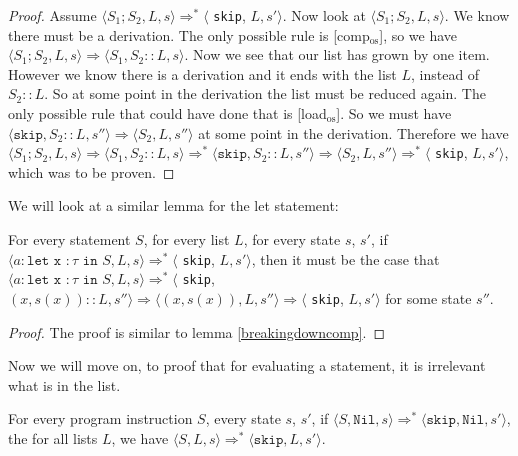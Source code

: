 \begin{proof}
Assume $\langle S_1; S_2, L, s \rangle \Rightarrow ^{*} \langle$ \texttt{skip}, $L, s' \rangle$. Now look at $\langle S_1; S_2, L, s \rangle$. We know there must be a derivation. The only possible rule is [comp$_{\textrm{os}}$], so we have $\langle S_1; S_2, L, s \rangle \Rightarrow \langle S_1, S_2::L, s \rangle$. Now we see that our list has grown by one item. However we know there is a derivation and it ends with the list $L$, instead of $S_2::L$. So at some point in the derivation the list must be reduced again. The only possible rule that could have done that is [load$_{\textrm{os}}$]. So we must have $\langle \texttt{skip} , S_2::L, s'' \rangle \Rightarrow \langle S_2, L, s'' \rangle$ at some point in the derivation. Therefore we have $\langle S_1; S_2, L, s \rangle \Rightarrow \langle S_1, S_2::L, s \rangle \Rightarrow ^{*} \langle \texttt{skip} , S_2::L, s'' \rangle \Rightarrow \langle S_2, L, s'' \rangle \Rightarrow ^{*} \langle$ \texttt{skip}, $L, s' \rangle$, which was to be proven.
\end{proof}

We will look at a similar lemma for the let statement:

\begin{lemma}
\label{breakingdownlet}
For every statement $S$, for every list $L$, for every state $s$, $s'$, if $\langle a : \texttt{let x } : \tau \texttt{ in } S , L, s \rangle \Rightarrow ^{*} \langle$ \texttt{skip}, $L, s' \rangle$, then it must be the case that $\langle a : \texttt{let x } : \tau \texttt{ in } S, L, s \rangle \Rightarrow ^{*} \langle$ \texttt{skip}, $(x,s(x))::L, s'' \rangle \Rightarrow \langle (x,s(x)), L, s'' \rangle \Rightarrow \langle$ \texttt{skip}, $L, s' \rangle$ for some state $s''$. 
\end{lemma}

\begin{proof}
The proof is similar to lemma \ref{breakingdowncomp}. 
\end{proof}

Now we will move on, to proof that for evaluating a statement, it is irrelevant what is in the list. 

\begin{proposition}
For every program instruction $S$, every state $s$, $s'$, if $\langle S, \texttt{Nil}, s \rangle \Rightarrow ^{*} \langle \texttt{skip}, \texttt{Nil}, s' \rangle$, the for all lists $L$, we have $\langle S, L, s \rangle \Rightarrow ^{*} \langle \texttt{skip}, L, s' \rangle$. 
\end{proposition}


